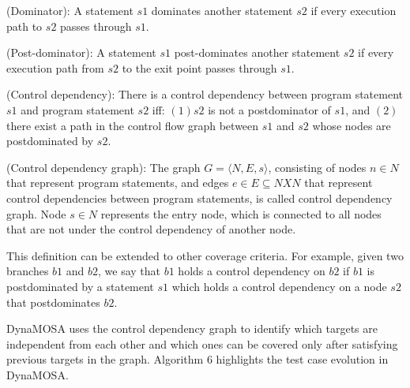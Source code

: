 \begin{definition}
    (Dominator): A statement $ s1 $ dominates another statement $ s2 $ if every execution path to $ s2 $ passes through $ s1 $.
\end{definition}
\begin{definition}
    (Post-dominator): A statement $ s1 $ post-dominates another statement $ s2 $ if every execution path from $ s2 $ to the exit point passes through $ s1 $. 
\end{definition}
\begin{definition}
    (Control dependency): There is a control dependency between program statement $ s1 $ and program statement $ s2 $ iff: $ (1) s2 $ is not a postdominator of $ s1 $, and $ (2) $ there exist a path in the control flow graph between $ s1 $ and $ s2 $ whose nodes are postdominated by $ s2 $.
\end{definition}
\begin{definition}
    (Control dependency graph): The graph $ G = \langle N, E, s \rangle $, consisting of nodes $ n \in N $ that represent program statements, and edges $ e \in E \subseteq N X N $ that represent control dependencies between program statements, is called control dependency graph. Node $ s \in N $ represents the entry node, which is connected to all nodes that are not under the control dependency of another node.
\end{definition}


This definition can be extended to other coverage criteria. For example, given two branches $ b1 $ and $ b2 $,  we say that $ b1 $ holds a control dependency on $ b2 $ if $ b1 $ is postdominated by a statement $ s1 $ which holds a control dependency on a node $ s2 $ that postdominates $ b2 $.

DynaMOSA uses the control dependency graph to identify which targets are independent from each other and which ones can be covered only after satisfying previous targets in the graph.
Algorithm 6 highlights the test case evolution in DynaMOSA.

